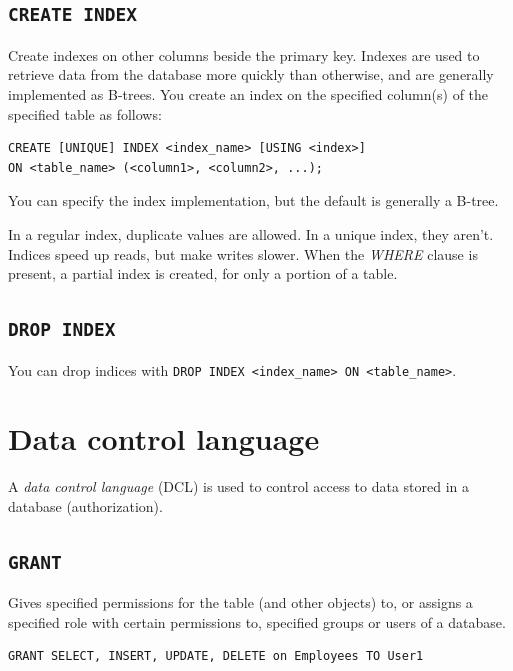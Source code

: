 \documentclass[table, xcdraw]{article}%
\begin{document}
\subsection{\texttt{CREATE INDEX}}

Create indexes on other columns beside the primary key. Indexes are used to retrieve data from the database more quickly than otherwise, and are generally implemented as B-trees. You create an index on the specified column(s) of the specified table as follows:

\begin{verbatim}
CREATE [UNIQUE] INDEX <index_name> [USING <index>]
ON <table_name> (<column1>, <column2>, ...); 
\end{verbatim}

You can specify the index implementation, but the default is generally a B-tree.

In a regular index, duplicate values are allowed. In a unique index, they aren't. Indices speed up reads, but make writes slower. When the \textit{WHERE} clause is present, a partial index is created, for only a portion of a table.

\subsection{\texttt{DROP INDEX}}

You can drop indices with \texttt{DROP INDEX <index_name> ON <table_name>}.

\section{Data control language}

A \emph{data control language} (DCL) is used to control access to data stored in a database (authorization).

\subsection{\texttt{GRANT}}

Gives specified permissions for the table (and other objects) to, or assigns a specified role with certain permissions to, specified groups or users of a database.

\begin{verbatim}
GRANT SELECT, INSERT, UPDATE, DELETE on Employees TO User1
\end{verbatim}
\end{document}
